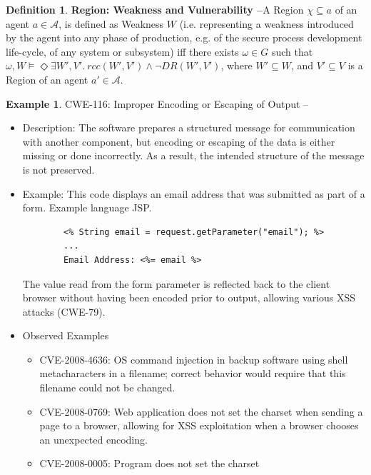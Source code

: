 \documentclass{article}
\theoremstyle{definition}
\newtheorem{definition}{Definition}[section]
\theoremstyle{corollary}
\theoremstyle{lemma}
\theoremstyle{theorem}
\theoremstyle{theorem}
\newtheorem{example}{Example}
\newcommand{\possibleworlds}{G}
\newcommand{\world}{\omega}
\newcommand{\region}{\chi}
\newcommand{\agentuniverse}{\mathcal{A}}
\newcommand{\agent}{a}
\newcommand{\Weakness}{W}
\newcommand{\Vulnerability}{V}
\newcommand{\rcc}{rcc}
\newcommand{\dr}[2]{DR(#1,#2)}
\begin{document}
\begin{definition}{\bf Region: Weakness and Vulnerability --}\label{def:weakness}
	A Region $\region\subseteq\agent$ of an agent
	$\agent\in\agentuniverse$, is defined as Weakness $\Weakness$ (i.e.
	representing a weakness introduced by the agent into any phase of
	production, e.g.  of the secure process development life-cycle, of any
	system or subsystem) iff there exists $\world\in\possibleworlds$ such
	that $\world,\Weakness\models\Diamond\exists\Weakness',\Vulnerability'.~
	\rcc(\Weakness',\Vulnerability')\wedge\neg\dr{\Weakness'}{\Vulnerability'}$, 
	where $\Weakness'\subseteq\Weakness$, and
	$\Vulnerability'\subseteq\Vulnerability$ is a Region of an agent $\agent'\in\agentuniverse$.
\end{definition}

\begin{example}{CWE-116: Improper Encoding or Escaping of Output\autocite{CWE-116} --}
	\begin{itemize} 
		\item Description: The software prepares a structured message
		for communication with another component, but encoding or
		escaping of the data is either missing or done incorrectly. As
		a result, the intended structure of the message is not
		preserved. 
		\item Example: This code displays an email
		address that was submitted as part of a form. Example language JSP.
		\begin{verbatim} 
		<% String email = request.getParameter("email"); %> 
		...
		Email Address: <%= email %>
		\end{verbatim}
		The value read from the form parameter is
		reflected back to the client browser without
		having been encoded prior to output, allowing
		various XSS attacks (CWE-79).
		\item Observed Examples
			\begin{itemize}
			\item CVE-2008-4636\autocite{CVE-2008-4636}: OS command injection in backup
				software using shell metacharacters in a
				filename; correct behavior would
				require that this filename could not be
				changed.
			\item CVE-2008-0769\autocite{CVE-2008-0769}: Web application does not set the
				charset when sending a page to a browser,
				allowing for XSS exploitation when a
				browser chooses an unexpected encoding.
			\item CVE-2008-0005\autocite{CVE-2008-0005}: Program does not set the charset

\end{itemize}
\end{itemize}
\end{example}
\end{document}
